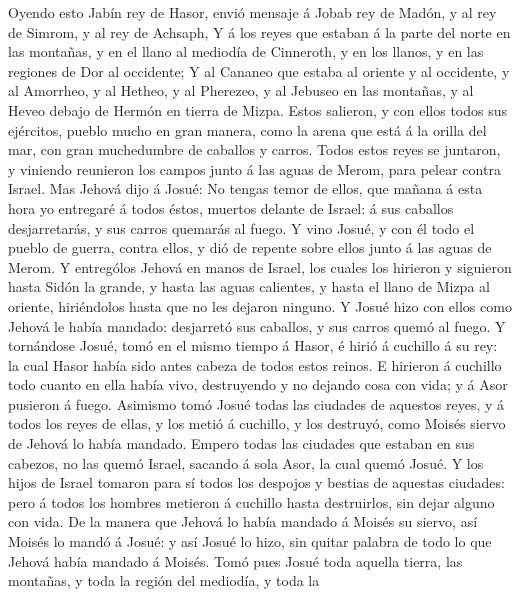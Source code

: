  Oyendo esto Jabín rey de Hasor, envió mensaje á Jobab rey
de Madón, y al rey de Simrom, y al rey de Achsaph,  Y á
los reyes que estaban á la parte del norte en las montañas, y en el
llano al mediodía de Cinneroth, y en los llanos, y en las regiones de
Dor al occidente;  Y al Cananeo que estaba al oriente y al
occidente, y al Amorrheo, y al Hetheo, y al Pherezeo, y al Jebuseo en
las montañas, y al Heveo debajo de Hermón en tierra de Mizpa.
 Estos salieron, y con ellos todos sus ejércitos, pueblo
mucho en gran manera, como la arena que está á la orilla del mar, con
gran muchedumbre de caballos y carros.  Todos estos reyes
se juntaron, y viniendo reunieron los campos junto á las aguas de Merom,
para pelear contra Israel.  Mas Jehová dijo á Josué: No
tengas temor de ellos, que mañana á esta hora yo entregaré á todos
éstos, muertos delante de Israel: á sus caballos desjarretarás, y sus
carros quemarás al fuego.  Y vino Josué, y con él todo el
pueblo de guerra, contra ellos, y dió de repente sobre ellos junto á las
aguas de Merom.  Y entrególos Jehová en manos de Israel,
los cuales los hirieron y siguieron hasta Sidón la grande, y hasta las
aguas calientes, y hasta el llano de Mizpa al oriente, hiriéndolos hasta
que no les dejaron ninguno.  Y Josué hizo con ellos como
Jehová le había mandado: desjarretó sus caballos, y sus carros quemó al
fuego.  Y tornándose Josué, tomó en el mismo tiempo á
Hasor, é hirió á cuchillo á su rey: la cual Hasor había sido antes
cabeza de todos estos reinos.  E hirieron á cuchillo todo
cuanto en ella había vivo, destruyendo y no dejando cosa con vida; y á
Asor pusieron á fuego.  Asimismo tomó Josué todas las
ciudades de aquestos reyes, y á todos los reyes de ellas, y los metió á
cuchillo, y los destruyó, como Moisés siervo de Jehová lo había mandado.
 Empero todas las ciudades que estaban en sus cabezos, no
las quemó Israel, sacando á sola Asor, la cual quemó Josué.
 Y los hijos de Israel tomaron para sí todos los despojos
y bestias de aquestas ciudades: pero á todos los hombres metieron á
cuchillo hasta destruirlos, sin dejar alguno con vida. 
De la manera que Jehová lo había mandado á Moisés su siervo, así Moisés
lo mandó á Josué: y así Josué lo hizo, sin quitar palabra de todo lo que
Jehová había mandado á Moisés.  Tomó pues Josué toda
aquella tierra, las montañas, y toda la región del mediodía, y toda la
